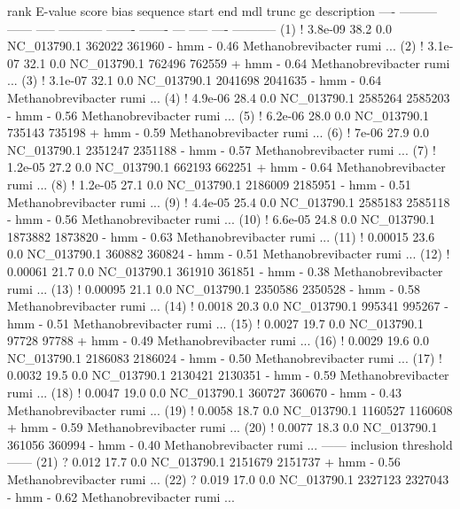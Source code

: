 \begin{sreoutput}
 rank     E-value  score  bias  sequence      start     end   mdl trunc   gc  description
 ----   --------- ------ -----  ----------- ------- -------   --- ----- ----  -----------
  (1) !   3.8e-09   38.2   0.0  NC_013790.1  362022  361960 - hmm     - 0.46  Methanobrevibacter rumi ...
  (2) !   3.1e-07   32.1   0.0  NC_013790.1  762496  762559 + hmm     - 0.64  Methanobrevibacter rumi ...
  (3) !   3.1e-07   32.1   0.0  NC_013790.1 2041698 2041635 - hmm     - 0.64  Methanobrevibacter rumi ...
  (4) !   4.9e-06   28.4   0.0  NC_013790.1 2585264 2585203 - hmm     - 0.56  Methanobrevibacter rumi ...
  (5) !   6.2e-06   28.0   0.0  NC_013790.1  735143  735198 + hmm     - 0.59  Methanobrevibacter rumi ...
  (6) !     7e-06   27.9   0.0  NC_013790.1 2351247 2351188 - hmm     - 0.57  Methanobrevibacter rumi ...
  (7) !   1.2e-05   27.2   0.0  NC_013790.1  662193  662251 + hmm     - 0.64  Methanobrevibacter rumi ...
  (8) !   1.2e-05   27.1   0.0  NC_013790.1 2186009 2185951 - hmm     - 0.51  Methanobrevibacter rumi ...
  (9) !   4.4e-05   25.4   0.0  NC_013790.1 2585183 2585118 - hmm     - 0.56  Methanobrevibacter rumi ...
 (10) !   6.6e-05   24.8   0.0  NC_013790.1 1873882 1873820 - hmm     - 0.63  Methanobrevibacter rumi ...
 (11) !   0.00015   23.6   0.0  NC_013790.1  360882  360824 - hmm     - 0.51  Methanobrevibacter rumi ...
 (12) !   0.00061   21.7   0.0  NC_013790.1  361910  361851 - hmm     - 0.38  Methanobrevibacter rumi ...
 (13) !   0.00095   21.1   0.0  NC_013790.1 2350586 2350528 - hmm     - 0.58  Methanobrevibacter rumi ...
 (14) !    0.0018   20.3   0.0  NC_013790.1  995341  995267 - hmm     - 0.51  Methanobrevibacter rumi ...
 (15) !    0.0027   19.7   0.0  NC_013790.1   97728   97788 + hmm     - 0.49  Methanobrevibacter rumi ...
 (16) !    0.0029   19.6   0.0  NC_013790.1 2186083 2186024 - hmm     - 0.50  Methanobrevibacter rumi ...
 (17) !    0.0032   19.5   0.0  NC_013790.1 2130421 2130351 - hmm     - 0.59  Methanobrevibacter rumi ...
 (18) !    0.0047   19.0   0.0  NC_013790.1  360727  360670 - hmm     - 0.43  Methanobrevibacter rumi ...
 (19) !    0.0058   18.7   0.0  NC_013790.1 1160527 1160608 + hmm     - 0.59  Methanobrevibacter rumi ...
 (20) !    0.0077   18.3   0.0  NC_013790.1  361056  360994 - hmm     - 0.40  Methanobrevibacter rumi ...
 ------ inclusion threshold ------
 (21) ?     0.012   17.7   0.0  NC_013790.1 2151679 2151737 + hmm     - 0.56  Methanobrevibacter rumi ...
 (22) ?     0.019   17.0   0.0  NC_013790.1 2327123 2327043 - hmm     - 0.62  Methanobrevibacter rumi ...

\end{sreoutput}
